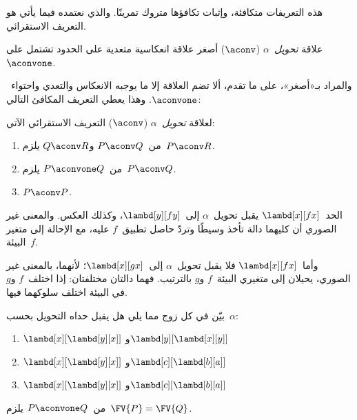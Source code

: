 \documentclass[../../../include/open-logic-section]{subfiles}
\begin{document}
هذه التعريفات متكافئة، وإثبات تكافؤها متروك تمرينًا. والذي نعتمده فيما يأتي هو التعريف الاستقرائي.

\begin{defn}
  علاقة \emph{تحويل~$\alpha$} ($\aconv$) أصغر علاقة انعكاسية متعدية على الحدود
  تشتمل على~$\aconvone$.
\end{defn}

والمراد بـ«أصغر»، على ما تقدم، ألا تضم العلاقة إلا ما يوجبه الانعكاس والتعدي
واحتواء~$\aconvone$. وهذا يعطي التعريف المكافئ التالي:

\begin{defn} 
  لعلاقة \emph{تحويل~$\alpha$} ($\aconv$) التعريف الاستقرائي الآتي:
  \begin{enumerate}
  \item من~$P \aconv Q$ و$Q \aconv R$ يلزم~$P \aconv R$.
  \item من~$P \aconvone Q$ يلزم~$P \aconv Q$. 
  \item $P \aconv P$. 
  \end{enumerate}
\end{defn}

\begin{ex}
  الحد~$\lambd[x][f x]$ يقبل تحويل~$\alpha$ إلى~$\lambd[y][f
  y]$، وكذلك العكس.
  والمعنى غير الصوري أن كليهما دالة تأخذ وسيطًا وتردّ حاصل تطبيق~$f$ عليه،
  مع الإحالة إلى متغير البيئة~$f$.

  وأما~$\lambd[x][f x]$ فلا يقبل تحويل~$\alpha$ إلى~$\lambd[x][g
    x]$؛
  لأنهما، بالمعنى غير الصوري، يحيلان إلى متغيري البيئة~$f$ و$g$ بالترتيب.
  فهما دالتان مختلفتان: إذا اختلف~$f$ و$g$ في البيئة اختلف سلوكهما فيها.
\end{ex}

\begin{prob}
  بيّن في كل زوج مما يلي هل يقبل حداه التحويل بحسب~$\alpha$:
  \begin{enumerate}
  \item $\lambd[x][\lambd[y][x]]$ و$\lambd[y][\lambd[x][y]]$
  \item $\lambd[x][\lambd[y][x]]$ و$\lambd[c][\lambd[b][a]]$
  \item $\lambd[x][\lambd[y][x]]$ و$\lambd[c][\lambd[b][a]]$
  \end{enumerate}
\end{prob}

\begin{lem}
  من~$P \aconvone Q$ يلزم~$\FV{P} = \FV{Q}$.
\end{lem}
\end{document}
